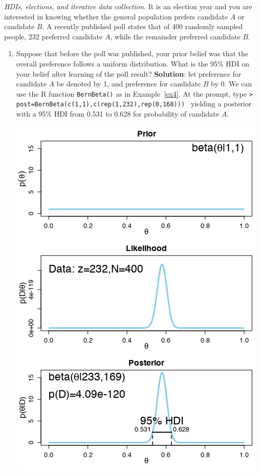 \begin{Example}
\textit{HDIs, elections, and iterative data collection.} It is an election year and you are interested in knowing whether the general population prefers candidate $A$ or candidate $B$. A recently published poll states that of 400 randomly sampled people, 232 preferred candidate $A$, while the remainder preferred candidate $B$.
\begin{enumerate}[noitemsep,label=(\alph*)]
\item Suppose that before the poll was published, your prior belief was that the overall preference follows a uniform distribution. What is the 95\% HDI on your belief after learning of the poll result?  
\newl 
\textbf{Solution}: let preference for candidate $A$ be denoted by 1, and preference for candidate $B$ by 0. We can use the R function \texttt{BernBeta()} as in Example~\ref{ex4}. At the prompt, type
\newl \footnotesize \texttt{> post=BernBeta(c(1,1),c(rep(1,232),rep(0,168))) }\normalsize\newl
 yielding a posterior with a 95\% HDI from 0.531 to 0.628 for probability of candidate $A$.
\begin{center}		\includegraphics[width=\linewidth]{Images/example8a}

\end{center}
\end{enumerate}
\end{Example}

